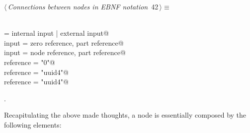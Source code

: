 \documentclass[
    a4paper,      %
    10pt,         %
    openright,    %
    notitlepage,  %
    parskip=half, %
]{scrreprt}       %
\theoremstyle{definition}                    %
\begin{document}
\begin{flushleft} \small
\begin{minipage}{\linewidth}\label{scrap53}\raggedright\small
{} $\langle\,${\itshape Connections between nodes in EBNF notation}\nobreak\ {\footnotesize {42}}$\,\rangle\equiv$
\vspace{-1ex}
\begin{list}{}{} \item
\mbox{}\lstinline@@\\
\mbox{}\lstinline@input = internal input | external input@\\
\mbox{}\lstinline@internal input = zero reference, part reference@\\
\mbox{}\lstinline@external input = node reference, part reference@\\
\mbox{}\lstinline@zero reference = "0"@\\
\mbox{}\lstinline@node reference = "uuid4"@\\
\mbox{}\lstinline@part reference = "uuid4"@\\
\mbox{}\lstinline@@{\NWsep}
\end{list}
\vspace{-1.5ex}
\footnotesize
\begin{list}{}{\setlength{\itemsep}{-\parsep}\setlength{\itemindent}{-\leftmargin}}
\item {\NWtxtMacroNoRef}.

\item{}
\end{list}
\end{minipage}\vspace{4ex}
\end{flushleft}
%

Recapitulating the above made thoughts, a node is essentially composed by the
following elements:
\end{document}
